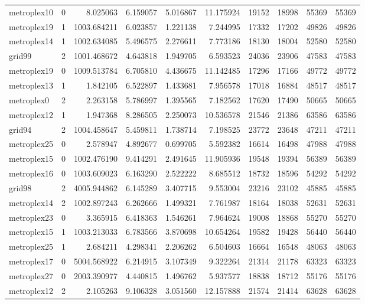 \begin{longtable}{|l|r|r|r|r|r|r|r|r|r|}
metroplex10 & 0 & 8.025063 & 6.159057 & 5.016867 & 11.175924 & 19152 & 18998 & 55369 & 55369 \\
metroplex19 & 1 & 1003.684211 & 6.023857 & 1.221138 & 7.244995 & 17332 & 17202 & 49826 & 49826 \\
metroplex14 & 1 & 1002.634085 & 5.496575 & 2.276611 & 7.773186 & 18130 & 18004 & 52580 & 52580 \\
grid99 & 2 & 1001.468672 & 4.643818 & 1.949705 & 6.593523 & 24036 & 23906 & 47583 & 47583 \\
metroplex19 & 0 & 1009.513784 & 6.705810 & 4.436675 & 11.142485 & 17296 & 17166 & 49772 & 49772 \\
metroplex13 & 1 & 1.842105 & 6.522897 & 1.433681 & 7.956578 & 17018 & 16884 & 48517 & 48517 \\
metroplex0 & 2 & 2.263158 & 5.786997 & 1.395565 & 7.182562 & 17620 & 17490 & 50665 & 50665 \\
metroplex12 & 1 & 1.947368 & 8.286505 & 2.250073 & 10.536578 & 21546 & 21386 & 63586 & 63586 \\
grid94 & 2 & 1004.458647 & 5.459811 & 1.738714 & 7.198525 & 23772 & 23648 & 47211 & 47211 \\
metroplex25 & 0 & 2.578947 & 4.892677 & 0.699705 & 5.592382 & 16614 & 16498 & 47988 & 47988 \\
metroplex15 & 0 & 1002.476190 & 9.414291 & 2.491645 & 11.905936 & 19548 & 19394 & 56389 & 56389 \\
metroplex16 & 0 & 1003.609023 & 6.163290 & 2.522222 & 8.685512 & 18732 & 18596 & 54292 & 54292 \\
grid98 & 2 & 4005.944862 & 6.145289 & 3.407715 & 9.553004 & 23216 & 23102 & 45885 & 45885 \\
metroplex14 & 2 & 1002.897243 & 6.262666 & 1.499321 & 7.761987 & 18164 & 18038 & 52631 & 52631 \\
metroplex23 & 0 & 3.365915 & 6.418363 & 1.546261 & 7.964624 & 19008 & 18868 & 55270 & 55270 \\
metroplex15 & 1 & 1003.213033 & 6.783566 & 3.870698 & 10.654264 & 19582 & 19428 & 56440 & 56440 \\
metroplex25 & 1 & 2.684211 & 4.298341 & 2.206262 & 6.504603 & 16664 & 16548 & 48063 & 48063 \\
metroplex17 & 0 & 5004.568922 & 6.214915 & 3.107349 & 9.322264 & 21314 & 21178 & 63323 & 63323 \\
metroplex27 & 0 & 2003.390977 & 4.440815 & 1.496762 & 5.937577 & 18838 & 18712 & 55176 & 55176 \\
metroplex12 & 2 & 2.105263 & 9.106328 & 3.051560 & 12.157888 & 21574 & 21414 & 63628 & 63628 \\

\end{longtable}
